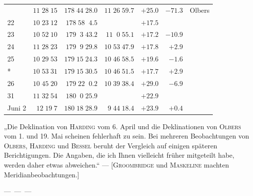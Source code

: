 \begin{longtable}{lrrrrrl}
 & $11\;28\;15$ & $178\;44\;28.0$ & $11\;26\;59.7$ & $+25.0$ & $-71.3$ & Olbers \\
22 & $10\;23\;12$ & $178\;58\;\;4.5$ &  & $+17.5$ &  &  \\
23 & $10\;52\;10$ & $179\;\;3\;43.2$ & $11\;\;0\;55.1$ & $+17.2$ & $-10.9$ &  \\
24 & $11\;28\;23$ & $179\;\;9\;29.8$ & $10\;53\;47.9$ & $+17.8$ & $+2.9$ &  \\
25 & $10\;29\;53$ & $179\;15\;24.3$ & $10\;46\;58.5$ & $+19.6$ & $-1.6$ &  \\*
 & $10\;53\;31$ & $179\;15\;30.5$ & $10\;46\;51.5$ & $+17.7$ & $+2.9$ &  \\
26 & $10\;45\;20$ & $179\;22\;\;0.2$ & $10\;39\;38.4$ & $+29.0$ & $-6.9$ &  \\
31 & $11\;32\;54$ & $180\;\;0\;25.9$ &  & $+22.9$ &  &  \\
Juni 2 & $12\;19\;7$ & $180\;18\;28.9$ & $9\;44\;18.4$ & $+23.9$ & $+0.4$ &  \\
\end{longtable}
\endgroup
\smallskip
\par\indent „Die Deklination von \textsc{Harding} vom 6. April und die Deklinationen von \textsc{Olbers} vom 1. und 19. Mai scheinen fehlerhaft zu sein. Bei mehreren Beobachtungen von \textsc{Olbers}, \textsc{Harding} und \textsc{Bessel} beruht der Vergleich auf einigen späteren Berichtigungen. Die Angaben, die ich Ihnen vielleicht früher mitgeteilt habe, werden daher etwas abweichen.“ — [\textsc{Groombridge} und \textsc{Maskeline} machten Meridianbeobachtungen.]

\smallskip
\noindent---\ ---\ ---

\begin{flushright}
\end{flushright}
